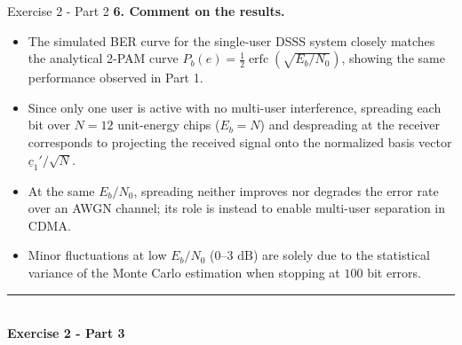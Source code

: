 \documentclass[10pt, aspectratio=169]{beamer}
\newcommand{\question}[1]{{\color{QuestionRed}\textbf{#1}}}
\begin{document}
	\begin{frame}{Exercise 2 - Part 2}
		\question{6. Comment on the results.}
		
		\vspace{0.1cm}
		\begin{itemize}
			\item The simulated BER curve for the single-user DSSS system closely matches the analytical 2-PAM curve $P_b(e) = \frac{1}{2}\operatorname{erfc}(\sqrt{E_b/N_0})$, showing the same performance observed in Part 1.
			\item Since only one user is active with no multi-user interference, spreading each bit over $N = 12$ unit-energy chips ($E_b = N$) and despreading at the receiver corresponds to projecting the received signal onto the normalized basis vector $\underline{c}_1'/\sqrt{N}$.
			\item At the same $E_b/N_0$, spreading neither improves nor degrades the error rate over an AWGN channel; its role is instead to enable multi-user separation in CDMA.
			\item Minor fluctuations at low $E_b/N_0$ ($0\text{–}3\text{ dB}$) are solely due to the statistical variance of the Monte Carlo estimation when stopping at $100$ bit errors.
		\end{itemize}
		
	\end{frame}
	
	\begin{frame}[plain]
		\vfill
		\centering
		{\color{TealAccent}\rule{2cm}{2pt}}\\[0.4cm]
		{\LARGE\bfseries\color{NavyPrimary} Exercise 2 - Part 3}\\[0.2cm]
		\vfill
	\end{frame}
	
\end{document}
